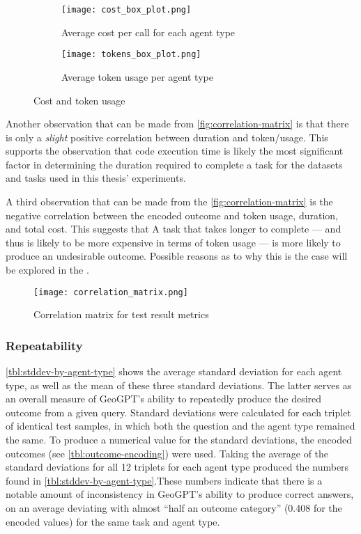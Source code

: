 \begin{figure}[htbp]
    \centering
    \begin{subfigure}[b]{0.48\textwidth}
        \centering
        \texttt{[image: cost\_box\_plot.png]}
        \caption{Average cost per call for each agent type}
        \label{fig:cost-box-plot}
    \end{subfigure}
    \hfill
    \begin{subfigure}[b]{0.48\textwidth}
        \centering
        \texttt{[image: tokens\_box\_plot.png]}
        \caption{Average token usage per agent type}
        \label{fig:tokens-box-plot}
    \end{subfigure}
    \caption{Cost and token usage}
    \label{fig:cost-and-tokens}
\end{figure}

Another observation that can be made from \autoref{fig:correlation-matrix} is that there is only a \textit{slight} positive correlation between duration and token/usage. This supports the observation that code execution time is likely the most significant factor in determining the duration required to complete a task for the datasets and tasks used in this thesis' experiments.

A third observation that can be made from the \autoref{fig:correlation-matrix} is the negative correlation between the encoded outcome and token usage, duration, and total cost. This suggests that A task that takes longer to complete --- and thus is likely to be more expensive in terms of token usage --- is more likely to produce an undesirable outcome. Possible reasons as to why this is the case will be explored in the .

\begin{figure}[htbp]
    \centering
    \texttt{[image: correlation\_matrix.png]}
    \caption{Correlation matrix for test result metrics}
    \label{fig:correlation-matrix}
\end{figure}

\subsubsection{Repeatability}

\autoref{tbl:stddev-by-agent-type} shows the average standard deviation for each agent type, as well as the mean of these three standard deviations. The latter serves as an overall measure of GeoGPT's ability to repeatedly produce the desired outcome from a given query. Standard deviations were calculated for each triplet of identical test samples, in which both the question and the agent type remained the same. To produce a numerical value for the standard deviations, the encoded outcomes (see \autoref{tbl:outcome-encoding}) were used. Taking the average of the standard deviations for all 12 triplets for each agent type produced the numbers found in \autoref{tbl:stddev-by-agent-type}.These numbers indicate that there is a notable amount of inconsistency in GeoGPT's ability to produce correct answers, on an average deviating with almost \enquote{half an outcome category} (0.408 for the encoded values) for the same task and agent type.

